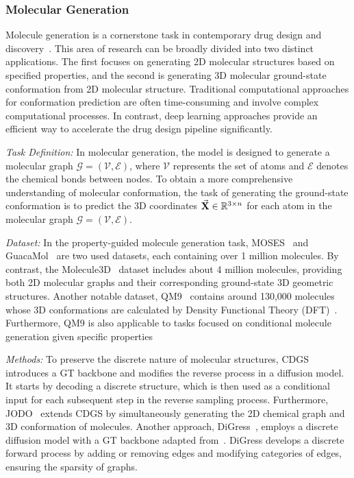 \subsubsection{\textbf{Molecular Generation}}
Molecule generation is a cornerstone task in contemporary drug design and discovery~\cite{Wang2025DiffusionMF}. 
This area of research can be broadly divided into 
two distinct applications. 
The first focuses on generating 2D molecular structures based on specified properties, and the second is generating 3D molecular ground-state conformation from 2D molecular structure. Traditional computational approaches for conformation prediction are often time-consuming and involve complex computational processes. In contrast, deep learning approaches 
provide an efficient way to accelerate the drug design pipeline significantly.

\textit{Task Definition:}
In molecular generation, the model is designed to generate a molecular graph $\mathcal G = (\mathcal V, \mathcal E)$, 
where $\mathcal V$ represents the set of atoms and $\mathcal E$ denotes the chemical bonds between nodes.
To obtain a more comprehensive understanding of molecular conformation, 
the task of generating the ground-state conformation is to predict the 3D coordinates $\vec{\mathbf{X}} \in \mathbb{R}^{3 \times n}$ for each atom in the molecular graph $\mathcal G = (\mathcal V, \mathcal E)$.

\textit{Dataset:}
In the property-guided molecule generation task,
MOSES~\cite{polykovskiy2020molecular} and GuacaMol~\cite{brown2019guacamol} are two used datasets,  
each containing over 1 million molecules. By contrast, the Molecule3D~\cite{xu2021molecule3d} dataset includes about 4 million molecules, providing both 2D molecular graphs and their corresponding ground-state 3D geometric structures. Another notable dataset, QM9~\cite{ramakrishnan2014quantum} contains around 130,000 molecules whose 3D conformations are calculated by Density Functional Theory (DFT)~\cite{parr1979local}. Furthermore, QM9 is also applicable to tasks focused on conditional molecule generation given specific properties

\textit{Methods:}
To preserve the discrete nature of molecular structures, CDGS~\cite{huang2023conditional} introduces a GT backbone and modifies the reverse process in a diffusion model. It starts by decoding a discrete structure, which is then used as a conditional input for each subsequent step in the reverse sampling process. 
Furthermore, JODO~\cite{huang2024learning} extends CDGS by simultaneously generating the 2D chemical graph and 3D conformation of molecules.
Another approach, DiGress~\cite{vignac2023digress}, employs a discrete diffusion model with a GT backbone adapted from~\cite{dwivedi2021generalization}. DiGress develops a discrete forward process by adding or removing edges and modifying categories of edges, ensuring the sparsity of graphs.  

